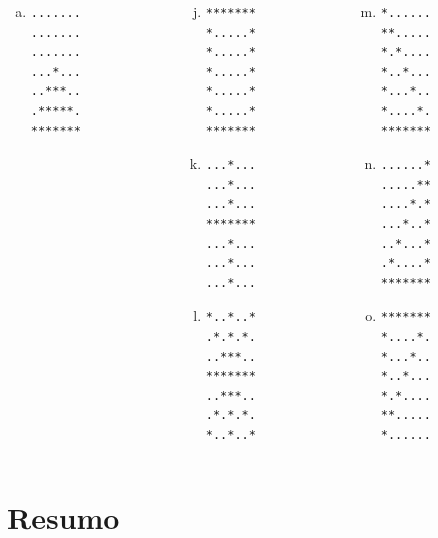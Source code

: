 \documentclass[xcolor={dvipsnames,table},aspectratio=169]{beamer}
\begin{document}
\begin{frame}[fragile]
{\begin{columns}[T]
\begin{column}{0.2\linewidth}
\begin{enumerate}[a)]
\begin{verbatim}
\end{verbatim}
	\item
\begin{verbatim}
.......
.......
.......
...*...
..***..
.*****.
*******
\end{verbatim}
\end{enumerate}
	\end{column}
	\begin{column}{0.2\linewidth}
\begin{enumerate}[a)]
  \setcounter{enumi}{9}
	\item
\begin{verbatim}
*******
*.....*
*.....*
*.....*
*.....*
*.....*
*******

\end{verbatim}
	\item
\begin{verbatim}
...*...
...*...
...*...
*******
...*...
...*...
...*...

\end{verbatim}
	\item
\begin{verbatim}
*..*..*
.*.*.*.
..***..
*******
..***..
.*.*.*.
*..*..*
\end{verbatim}
\end{enumerate}
	\end{column}
	\begin{column}{0.2\linewidth}
\begin{enumerate}[a)]
  \setcounter{enumi}{12}
	\item
\begin{verbatim}
*......
**.....
*.*....
*..*...
*...*..
*....*.
*******

\end{verbatim}
	\item
\begin{verbatim}
......*
.....**
....*.*
...*..*
..*...*
.*....*
*******

\end{verbatim}
	\item
\begin{verbatim}
*******
*....*.
*...*..
*..*...
*.*....
**.....
*......
\end{verbatim}
\end{enumerate}
	\end{column}\end{columns}
}
\end{frame}

\section{Resumo}
\end{document}
